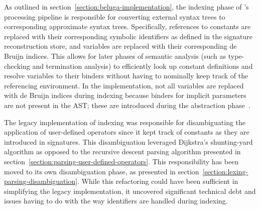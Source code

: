 As outlined in section~\ref{section:beluga-implementation}, the indexing phase of \Beluga's processing pipeline is responsible for converting external syntax trees to corresponding approximate syntax trees.
Specifically, references to constants are replaced with their corresponding symbolic identifiers as defined in the signature reconstruction store, and variables are replaced with their corresponding de Bruijn indices.
This allows for later phases of semantic analysis (such as type-checking and termination analysis) to efficiently look up constant definitions and resolve variables to their binders without having to nominally keep track of the referencing environment.
In the implementation, not all variables are replaced with de Bruijn indices during indexing because binders for implicit parameters are not present in the \ac{AST}; these are introduced during the abstraction phase~\cite{germain2010implementation}.



The legacy implementation of indexing was responsible for disambiguating the application of user-defined operators since it kept track of constants as they are introduced in \Beluga signatures.
This disambiguation leveraged Dijkstra's shunting-yard algorithm as opposed to the recursive descent parsing algorithm presented in section~\ref{section:parsing-user-defined-operators}.
This responsibility has been moved to its own disambiguation phase, as presented in section~\ref{section:lexing-parsing-disambiguation}.
While this refactoring could have been sufficient in simplifying the legacy implementation, it uncovered significant technical debt and issues having to do with the way identifiers are handled during indexing.

